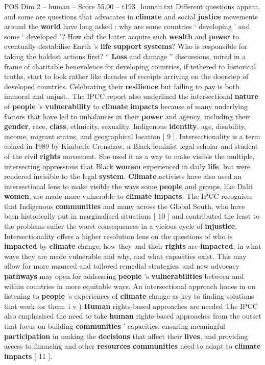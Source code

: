 \begin{textsample}{POS Dim 2 – human – Score 55.00 – t193\_human.txt}
Different questions appear, and some are questions that advocates in \textbf{climate} and social \textbf{justice} movements around the \textbf{world} have long asked : why are some countries ‘ developing ’ and some ‘ developed ’?
How did the latter acquire such \textbf{wealth} and \textbf{power} to eventually destabilise Earth ’s \textbf{life} \textbf{support} \textbf{systems}?
Who is responsible for taking the boldest actions first? “ \textbf{Loss} and damage ” discussions, mired in a frame of charitable benevolence for developing countries, if tethered to historical truths, start to look rather like decades of receipts arriving on the doorstep of developed countries.
Celebrating their \textbf{resilience} but failing to pay is both immoral and unjust..
The IPCC report also underlined the intersectional \textbf{nature} of \textbf{people} ’s \textbf{vulnerability} to \textbf{climate} \textbf{impacts} because of many underlying factors that have led to imbalances in their \textbf{power} and agency, including their \textbf{gender}, race, \textbf{class}, ethnicity, sexuality, Indigenous \textbf{identity}, age, disability, income, migrant status, and geographical location [ 9 ].
Intersectionality is a term coined in 1989 by Kimberle Crenshaw, a Black feminist legal scholar and student of the civil \textbf{rights} movement.
She used it as a way to make visible the multiple, intersecting oppressions that Black \textbf{women} experienced in daily \textbf{life}, but were rendered invisible to the legal \textbf{system}. \textbf{Climate} activists have also used an intersectional lens to make visible the ways some \textbf{people} and groups, like Dalit \textbf{women}, are made more vulnerable to \textbf{climate} \textbf{impacts}.
The IPCC recognises that Indigenous \textbf{communities} and many across the Global South, who have been historically put in marginalised situations [ 10 ] and contributed the least to the problems suffer the worst consequences in a vicious cycle of \textbf{injustice}.
Intersectionality offers a higher resolution lens on the questions of who is \textbf{impacted} by \textbf{climate} change, how they and their \textbf{rights} are \textbf{impacted}, in what ways they are made vulnerable and why, and what capacities exist.
This may allow for more nuanced and tailored remedial strategies, and new advocacy \textbf{pathways} may open for addressing \textbf{people} ’s \textbf{vulnerabilities} between and within countries in more equitable ways.
An intersectional approach hones in on listening to \textbf{people} ’s experiences of \textbf{climate} change as key to finding solutions that work for them. i v ) \textbf{Human} rights-based approaches are needed The IPCC also emphasised the need to take \textbf{human} rights-based approaches from the outset that focus on building \textbf{communities} ’ capacities, ensuring meaningful \textbf{participation} in making the \textbf{decisions} that affect their \textbf{lives}, and providing access to financing and other \textbf{resources} \textbf{communities} need to adapt to \textbf{climate} \textbf{impacts} [ 11 ].

\end{textsample}

